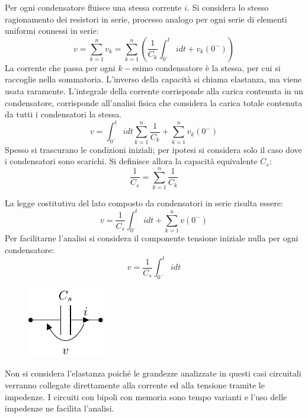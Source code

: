 \documentclass{article}
\numberwithin{equation}{subsection}
\begin{document}
Per ogni condensatore fluisce una stessa corrente $i$. Si considera lo stesso ragionamento dei resistori in serie, processo analogo per ogni serie di elementi uniformi 
connessi in serie:
\begin{equation*}
    v=\displaystyle\sum_{k=1}^nv_k=\sum_{k=1}^n\left(\frac{1}{C_k}\int_{0^-}^tidt+{v_k(0^-)}\right)
\end{equation*} 
La corrente che passa per ogni $k-$esimo condensatore è la stessa, per cui si raccoglie nella sommatoria. L'inverso della capacità si chiama elastanza, ma viene usata 
raramente. L'integrale della corrente corrisponde alla carica contenuta in un condensatore, corrisponde all'analisi fisica che considera la carica totale contenuta da tutti 
i condensatori la stessa. 
\begin{equation*}
    v=\displaystyle\int_{0^-}^tidt\sum_{k=1}^n\frac{1}{C_k}+\sum_{k=1}^nv_k(0^-)
\end{equation*}
Spesso si trascurano le condizioni iniziali; per ipotesi si considera solo il caso dove i condensatori sono scarichi. Si definisce allora la capacità equivalente $C_s$:
\begin{equation*}
    \displaystyle\frac{1}{C_s}=\sum_{k=1}^n\frac{1}{C_k}
\end{equation*}

La legge costitutiva del lato composto da condensatori in serie risulta essere:
\begin{equation*}
    v=\displaystyle\frac{1}{C_s}\int_{0^-}^tidt+\sum_{k=1}^nv(0^-)
\end{equation*}
Per facilitarne l'analisi si considera il componente tensione iniziale nulla per ogni condensatore:
\begin{equation}
    v=\displaystyle\frac{1}{C_s}\int_{0^-}^tidt
\end{equation}

\begin{figure}[H]%
    \centering
    \includegraphics{condensatore-serie-equivalente.pdf}%
    \label{fig:condensatore-serie-equivalente}
\end{figure}

Non si considera l'elastanza poiché le grandezze analizzate in questi casi circuitali verranno collegate direttamente alla corrente ed alla tensione tramite le impedenze. 
I circuiti con bipoli con memoria sono tempo varianti e l'uso delle impedenze ne facilita l'analisi. 
\end{document}
